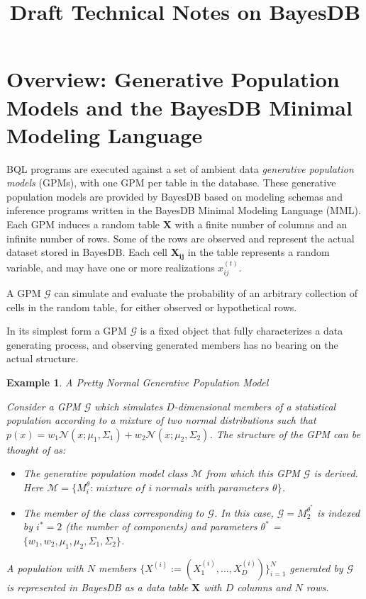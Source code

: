 \documentclass[10pt,letterpaper]{article}
\title{Draft Technical Notes on BayesDB}
\newtheorem{example}{Example}[section]
\newcommand{\set}[1]{\{#1\}}
\begin{document}
\maketitle
\section{Overview: Generative Population Models and the BayesDB Minimal Modeling Language}
\label{sec:overview}

BQL programs are executed against a set of ambient data \textit{generative
population models} (GPMs), with one GPM per table in the database. These
generative population models are provided by BayesDB based on modeling schemas
and inference programs written in the BayesDB Minimal Modeling Language (MML).
Each GPM induces a random table $\mathbf{X}$ with a finite  number of columns
and an infinite number of rows. Some of the rows are observed and represent the
actual dataset stored in BayesDB. Each cell $\mathbf{X_{ij}}$ in the table
represents a random variable, and may have one or more realizations
$x_{ij}^{(t)}$.

A GPM $\mathcal{G}$ can simulate and evaluate the probability of an arbitrary
collection of cells in the random table, for either observed or hypothetical
rows.

In its simplest form a GPM $\mathcal{G}$ is a fixed object that fully
characterizes a data generating process, and observing generated members has no
bearing on the actual structure.

\begin{example} \label{ex:normal_gpm} A Pretty Normal Generative Population Model

Consider a GPM $\mathcal{G}$ which simulates $D$-dimensional members of a
statistical population according to a mixture of two normal distributions such
that $p(x)= w_1\mathcal{N}(x;\mu_1,\Sigma_1) +
w_2\mathcal{N}(x;\mu_2,\Sigma_2)$. The \textit{structure} of the GPM can be
thought of as:
\begin{itemize}

\item The generative population model class $\mathcal{M}$ from which this GPM
 $\mathcal{G}$ is derived. Here $\mathcal{M} = \set{M_i^\theta \textit{: mixture
 of } i \textit{ normals with parameters } \theta}$.

\item  The member of the class corresponding to $\mathcal{G}$. In this case,
$\mathcal{G}=M_2^{\theta^*}$ is indexed by $i^*=2$ (the number of components)
and parameters $\theta^*$ = $\set{w_1,w_2,\mu_1,\mu_2,\Sigma_1,\Sigma_2}$.
\end{itemize}

A population with $N$ members $\{X^{(i)} := (X_1^{(i)},\dots,X_D^{(i)})
\}_{i=1}^N$ generated by $\mathcal{G}$ is represented in BayesDB as a data table
$\mathbf{X}$ with $D$ columns and $N$ rows.
\end{example}
\end{document}
